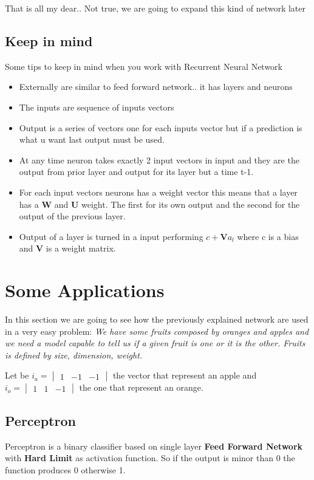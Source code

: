\documentclass[12pt,a4paper,twoside,openright]{scrbook}
\begin{document}
That is all my dear.. Not true, we are going to expand this kind of network later

\subsection{Keep in mind}
Some tips to keep in mind when you work with Recurrent Neural Network
\begin{itemize}
\item Externally are similar to feed forward network.. it has layers and neurons
\item The inputs are sequence of inputs vectors
\item Output is a series of vectors one for each inputs vector but if a prediction is what u want last output must be used.
\item At any time neuron takes exactly 2 input vectors in input and they are the output from prior layer and output for its layer but a time t-1. 
\item For each input vectors neurons has a weight vector this means that a layer has a \textbf{W} and \textbf{U} weight. The first for its own output and the second for the output of the previous layer.
\item Output of a layer is turned in a input performing $c + \textbf{V}a_l$ where c is a bias and \textbf{V} is a weight matrix.
\end{itemize}

\section{Some Applications}
In this section we are going to see how the previously explained network are used in a very easy problem:
\emph{
We have some fruits composed by oranges and apples and we need a model capable to tell us if a given fruit is one or it is the other. Fruits is defined by size, dimension, weight.
}

Let be $i_a = \begin{vmatrix}
1 & -1 & -1
\end{vmatrix}$ the vector that represent an apple and  $i_o = \begin{vmatrix}
1 & 1 & -1
\end{vmatrix}$ the one that represent an orange. 

\subsection{Perceptron}
Perceptron is a binary classifier based on single layer \textbf{Feed Forward Network} with \textbf{Hard Limit} as activation function. So if the output is minor than 0 the function produces 0 otherwise 1.
\end{document}

